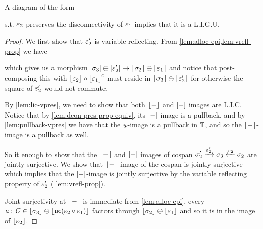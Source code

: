 \begin{lemma}\label{lem:dcon-ligu}
    A diagram of the form
    s.t. $\varepsilon_2$ preserves the disconnectivity of $\varepsilon_1$ implies that it is a L.I.G.U.
\end{lemma}
\begin{proof}
    We first show that $\varepsilon_2'$ is variable reflecting.
    From \cref{lem:alloc-epi,lem:vrefl-prop} we have
    \begin{center}
    \end{center}
    which gives us a morphism $[\sigma_3] \ominus [\varepsilon_2'] \to \lfloor\sigma_2\rfloor \ominus \lfloor\varepsilon_1\rfloor$ and notice that
    post-composing this with $\lfloor\varepsilon_2\rfloor \circ {\lfloor\varepsilon_1\rfloor}^\mathsf{c}$ must reside in $\lfloor\sigma_3\rfloor \ominus \lfloor\varepsilon_2'\rfloor$ 
    for otherwise the square of $\varepsilon_2'$ would not commute.

    By \cref{lem:lic-vpres}, we need to show that both $\lfloor-\rfloor$ and $[-]$ images are L.I.C. 
    Notice that by \cref{lem:dcon-pres-prop-equiv}, its $[-]$-image is a pullback, 
    and by \cref{lem:pullback-vpres} we have that the $\mathit{u}$-image is a pullback in $\mathbb{T}$,
    and so the $\lfloor-\rfloor$-image is a pullback as well. 

    So it enough to show that the $\lfloor-\rfloor$ and $[-]$ images of cospan $\sigma_2' \xrightarrow{\varepsilon_2'} \sigma_3 \xleftarrow{\varepsilon_2} \sigma_2$ are jointly surjective.
    We show that $\lfloor-\rfloor$-image of the cospan is jointly surjective which implies that the $[-]$-image is jointly surjective
    by the variable reflecting property of $\varepsilon_2'$ (\cref{lem:vrefl-prop}).

    Joint surjectivity at $\lfloor-\rfloor$ is immediate from \cref{lem:alloc-epi}, every $\mathit{a} : \mathit{C} \in \lfloor\sigma_3\rfloor \ominus \lfloor\mathsf{uc}(\varepsilon_2 \circ \varepsilon_1)\rfloor$ 
    factors through $\lfloor\sigma_2\rfloor \ominus \lfloor\varepsilon_1\rfloor$ and so it is in the image of $\lfloor\varepsilon_2\rfloor$.
\end{proof}

